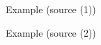 

\begin{frame}{Example (source (1))}
  
  \begin{center}
  
  \end{center}
  
\end{frame}

\begin{frame}{Example (source (2))}
  
  \begin{center}
  
  \end{center}
  
\end{frame}

